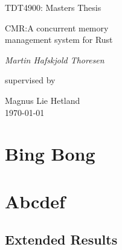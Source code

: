 \documentclass[b5paper, twoside, openright]{report}
\theoremstyle{plain}
\theoremstyle{definition}
\begin{document}
\renewcommand{\thepage}{\roman{page}}%

\begin{titlepage}
  \centering
  \null%
  \vspace{1cm}
  {\Large TDT4900: Masters Thesis \par}
  \vspace{2cm}
  {\huge CMR:\@ A concurrent memory\\ management system for Rust\par}
  \vspace{3cm}
  {\Large\itshape{}Martin Hafskjold Thoresen\par}
  \vfill
  supervised by\par
  {\large Magnus Lie Hetland}\\
  \vspace{2cm}
  {\large \today\\}
\end{titlepage}








\tableofcontents%
\listoffigures%


\clearpage\null%
\clearpage\setcounter{page}{1}%
\renewcommand{\thepage}{\arabic{page}}%
\part{Bing Bong}




\pagestyle{fancy}










\part{Abcdef}











\begin{appendices}
\appendix
  \chapter{Extended Results\label{ap:results}}
\end{appendices}

\printglossary[type=\acronymtype,title=Abbreviations]
\printglossary{}



\end{document}

